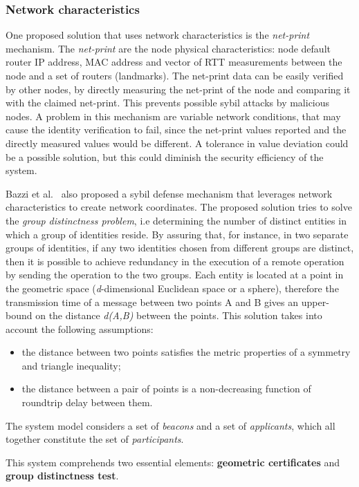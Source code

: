 \subsubsection{Network characteristics}
One proposed solution that uses network characteristics is the \textit{net-print}~\cite{Wang2005} mechanism.
The \textit{net-print} are the node physical characteristics: node default router IP address, \acs{MAC} address and vector of \ac{RTT} measurements between the node and a set of routers (landmarks).
The net-print data can be easily verified by other nodes, by directly measuring the net-print of the node and comparing it with the claimed net-print.
This prevents possible sybil attacks by malicious nodes.
A problem in this mechanism are variable network conditions, that may cause the identity verification to fail, since the net-print values reported and the directly measured values would be different.
A tolerance in value deviation could be a possible solution, but this could diminish the security efficiency of the system.

Bazzi et al.~\cite{Bazzi2005} also proposed a sybil defense mechanism that leverages network characteristics to create network coordinates.
The proposed solution tries to solve the \textit{group distinctness problem}, i.e determining the number of distinct entities in which a group of identities reside.
By assuring that, for instance, in two separate groups of identities, if any two identities chosen from different groups are distinct, then it is possible to achieve redundancy in the execution of a remote operation by sending the operation to the two groups.
Each entity is located at a point in the geometric space (\textit{d}-dimensional Euclidean space or a sphere), therefore the transmission time of a message between two points A and B gives an upper-bound on the distance \textit{d(A,B)} between the points.
This solution takes into account the following assumptions:
\begin{itemize}
	\item the distance between two points satisfies the metric properties of a symmetry and triangle inequality;
	\item the distance between a pair of points is a non-decreasing function of roundtrip delay between them.
\end{itemize}
The system model considers a set of \textit{beacons} and a set of \textit{applicants}, which all together constitute the set of \textit{participants}.

This system comprehends two essential elements: \textbf{geometric certificates} and \textbf{group distinctness test}.

